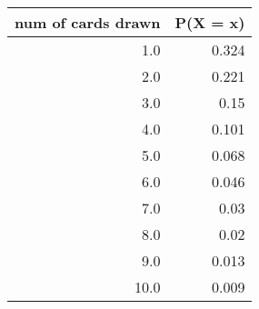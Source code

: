 \begin{tabular}{rr}
  \hline
  \textbf{num of cards drawn} & \textbf{P(X = x)} \\\hline
  1.0 & 0.324 \\
  2.0 & 0.221 \\
  3.0 & 0.15 \\
  4.0 & 0.101 \\
  5.0 & 0.068 \\
  6.0 & 0.046 \\
  7.0 & 0.03 \\
  8.0 & 0.02 \\
  9.0 & 0.013 \\
  10.0 & 0.009 \\\hline
\end{tabular}
